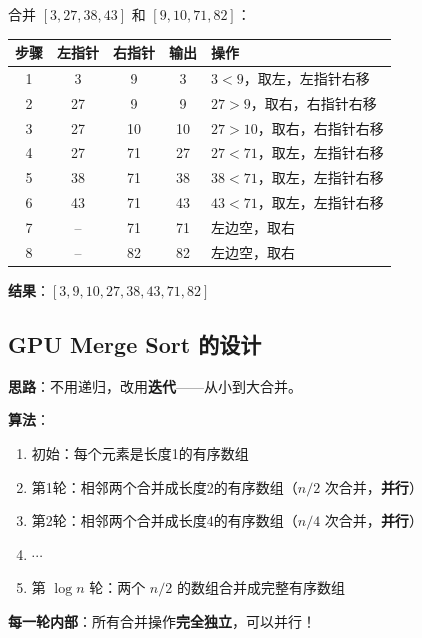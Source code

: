 \documentclass[12pt, a4paper]{ctexart}
\begin{document}
\begin{blackboard}

合并 $[3, 27, 38, 43]$ 和 $[9, 10, 71, 82]$：

\begin{center}
\begin{tabular}{c|cc|c|l}
\textbf{步骤} & \textbf{左指针} & \textbf{右指针} & \textbf{输出} & \textbf{操作} \\
\hline
1 & 3 & 9 & 3 & $3 < 9$，取左，左指针右移 \\
2 & 27 & 9 & 9 & $27 > 9$，取右，右指针右移 \\
3 & 27 & 10 & 10 & $27 > 10$，取右，右指针右移 \\
4 & 27 & 71 & 27 & $27 < 71$，取左，左指针右移 \\
5 & 38 & 71 & 38 & $38 < 71$，取左，左指针右移 \\
6 & 43 & 71 & 43 & $43 < 71$，取左，左指针右移 \\
7 & -- & 71 & 71 & 左边空，取右 \\
8 & -- & 82 & 82 & 左边空，取右 \\
\end{tabular}
\end{center}

\textbf{结果}：$[3, 9, 10, 27, 38, 43, 71, 82]$

\end{blackboard}

\subsection{GPU Merge Sort 的设计}

\begin{blackboard}

\textbf{思路}：不用递归，改用\textbf{迭代}——从小到大合并。

\textbf{算法}：
\begin{enumerate}
    \item 初始：每个元素是长度1的有序数组
    \item 第1轮：相邻两个合并成长度2的有序数组（$n/2$ 次合并，\textbf{并行}）
    \item 第2轮：相邻两个合并成长度4的有序数组（$n/4$ 次合并，\textbf{并行}）
    \item $\cdots$
    \item 第 $\log n$ 轮：两个 $n/2$ 的数组合并成完整有序数组
\end{enumerate}

\textbf{每一轮内部}：所有合并操作\textbf{完全独立}，可以并行！

\end{blackboard}
\end{document}
